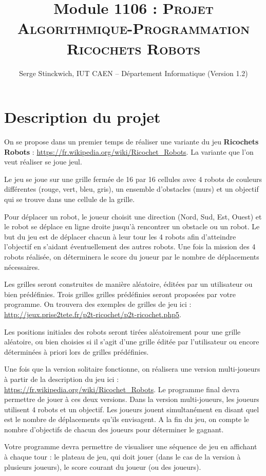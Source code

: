 \documentclass[10pt]{article}
\title{Module 1106 : \textsc{Projet Algorithmique-Programmation \\ Ricochets Robots}}
\author{Serge Stinckwich, IUT CAEN -- Département Informatique (Version 1.2)}
\begin{document}
\maketitle

\pagestyle{empty}

\section{Description du projet}

On se propose dans un premier temps de réaliser une variante du jeu {\bf Ricochets Robots} : \url{https://fr.wikipedia.org/wiki/Ricochet_Robots}. La variante que l'on veut réaliser se joue jeul.

Le jeu se joue sur une grille fermée de 16 par 16 cellules avec 4 robots de couleurs différentes (rouge, vert,
bleu, gris), un ensemble d'obstacles (murs) et un objectif qui se trouve dans une cellule de la grille.

Pour déplacer un robot, le joueur choisit une direction (Nord, Sud, Est, Ouest) et le robot
se déplace en ligne droite jusqu'à rencontrer un obstacle ou un robot. Le but du jeu
est de déplacer chacun à leur tour les 4 robots afin d'atteindre l'objectif en s'aidant éventuellement des autres robots. Une fois la mission des 4 robots réalisée, on déterminera le score du joueur par le nombre de déplacements nécessaires.

Les grilles seront construites de manière aléatoire, éditées par un utilisateur ou bien prédéfinies. 
Trois grilles grilles prédéfinies seront proposées par votre programme. On trouvera des exemples de grilles de jeu ici :
\url{http://jeux.prise2tete.fr/p2t-ricochet/p2t-ricochet.php5}.

Les positions initiales des robots seront tirées aléatoirement pour une grille aléatoire, ou bien choisies si il s'agit d'une grille éditée par l'utilisateur ou encore déterminées à priori lors de grilles prédéfinies.

 Une fois que la version solitaire fonctionne, on réalisera une version multi-joueurs à partir de la description du jeu ici :
\url{https://fr.wikipedia.org/wiki/Ricochet_Robots}. Le programme final devra permettre de jouer à ces deux versions.
Dans la version multi-joueurs, les joueurs utilisent 4 robots et un objectif. Les joueurs jouent simultanément en disant quel est le nombre de déplacements qu'ils envisagent. A la fin du jeu, on compte le nombre d'objectifs de chacun des joueurs pour déterminer le gagnant.

Votre programme devra permettre de visualiser une séquence de jeu en affichant à chaque tour : le plateau de jeu, qui doit jouer (dans le cas de la version à plusieurs joueurs), le score courant du joueur (ou des joueurs).
\end{document}
